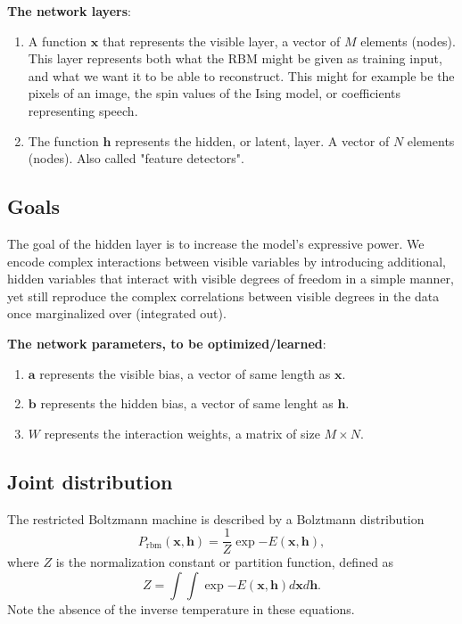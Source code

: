 \documentclass[%
oneside,                 %
final,                   %
10pt]{article}
\begin{document}
\textbf{The network layers}:
\begin{enumerate}
\item A function $\bm{x}$ that represents the visible layer, a vector of $M$ elements (nodes). This layer represents both what the RBM might be given as training input, and what we want it to be able to reconstruct. This might for example be the pixels of an image, the spin values of the Ising model, or coefficients representing speech.

\item The function $\bm{h}$ represents the hidden, or latent, layer. A vector of $N$ elements (nodes). Also called "feature detectors".
\end{enumerate}

\noindent
\subsection{Goals}

The goal of the hidden layer is to increase the model's expressive
power. We encode complex interactions between visible variables by
introducing additional, hidden variables that interact with visible
degrees of freedom in a simple manner, yet still reproduce the complex
correlations between visible degrees in the data once marginalized
over (integrated out).

\textbf{The network parameters, to be optimized/learned}:
\begin{enumerate}
 \item $\bm{a}$ represents the visible bias, a vector of same length as $\bm{x}$.

 \item $\bm{b}$ represents the hidden bias, a vector of same lenght as $\bm{h}$.

 \item $W$ represents the interaction weights, a matrix of size $M\times N$.
\end{enumerate}

\noindent
\subsection{Joint distribution}
The restricted Boltzmann machine is described by a Bolztmann distribution
\[
	P_{\mathrm{rbm}}(\bm{x},\bm{h}) = \frac{1}{Z} \exp{-E(\bm{x},\bm{h})},
\]
where $Z$ is the normalization constant or partition function, defined as 
\[
	Z = \int \int \exp{-E(\bm{x},\bm{h})} d\bm{x} d\bm{h}.
\]
Note the absence of the inverse temperature in these equations.
\end{document}
